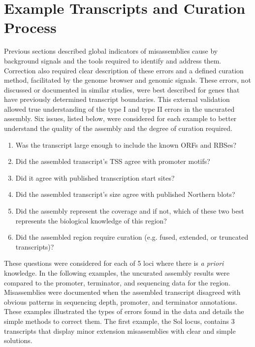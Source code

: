 



\section{Example Transcripts and Curation Process}
Previous sections described global indicators of misassemblies cause by background signals and the tools required to identify and address them. Correction also required clear description of these errors and a defined curation method, facilitated by the genome browser and genomic signals. These errors, not discussed or documented in similar studies, were best described for genes that have previously determined transcript boundaries. This external validation allowed true understanding of the type I and type II errors in the uncurated assembly. Six issues, listed below, were considered for each example to better understand the quality of the assembly and the degree of curation required. 

\begin{enumerate}
\item Was the transcript large enough to include the known ORFs and RBSes?
\item Did the assembled transcript's TSS agree with promoter motifs?
\item Did it agree with published transcription start sites?
\item Did the assembled transcript's size agree with published Northern blots?
\item Did the assembly represent the coverage and if not, which of these two best represents the biological knowledge of this region?
\item Did the assembled region require curation (e.g. fused, extended, or truncated transcripts)?
\end{enumerate}

These questions were considered for each of 5 loci where there is \textit{a priori} knowledge. In the following examples, the uncurated assembly results were compared to the promoter, terminator, and sequencing data for the region. Misassemblies were documented when the assembled transcript disagreed with obvious patterns in sequencing depth, promoter, and terminator annotations. These examples illustrated the types of errors found in the data and details the simple methods to correct them. The first example, the Sol locus, contains 3 transcripts that display minor extension misassemblies with clear and simple solutions. 

